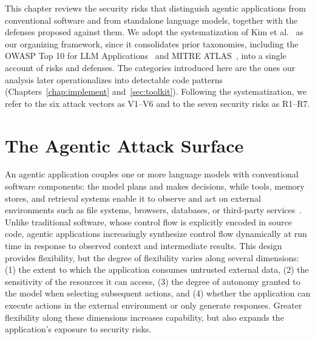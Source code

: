 \label{chap:back}


This chapter reviews the security risks that distinguish agentic applications from conventional software and from standalone language models, together with the defenses proposed against them. We adopt the systematization of Kim et al.~\cite{kim2026sok} as our organizing framework, since it consolidates prior taxonomies, including the OWASP Top 10 for LLM Applications~\cite{owasp} and MITRE ATLAS~\cite{mitre-atlas}, into a single account of risks and defenses. The categories introduced here are the ones our analysis later operationalizes into detectable code patterns (Chapters~\ref{chap:implement} and~\ref{sec:toolkit}). Following the systematization, we refer to the six attack vectors as V1--V6 and to the seven security risks as R1--R7.


\section{The Agentic Attack Surface}
\label{sec:surface}

An agentic application couples one or more language models with conventional software components: the model plans and makes decisions, while tools, memory stores, and retrieval systems enable it to observe and act on external environments such as file systems, browsers, databases, or third-party services~\cite{kim2026sok}. Unlike traditional software, whose control flow is explicitly encoded in source code, agentic applications increasingly synthesize control flow dynamically at run time in response to observed context and intermediate results. This design provides flexibility, but the degree of flexibility varies along several dimensions: (1) the extent to which the application consumes untrusted external data, (2) the sensitivity of the resources it can access, (3) the degree of autonomy granted to the model when selecting subsequent actions, and (4) whether the application can execute actions in the external environment or only generate responses. Greater flexibility along these dimensions increases capability, but also expands the application’s exposure to security risks.

